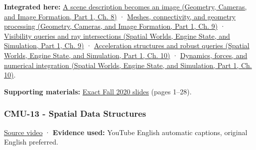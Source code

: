 \textbf{Integrated here:} \href{../03-Geometry-Cameras-and-Image-Formation-P01/main.pdf\#nameddest=03-visual-computing-i-ch001-a-scene-description-becomes-an-image}{A scene description becomes an image (Geometry, Cameras, and Image Formation, Part 1, Ch. 8)} · \href{../03-Geometry-Cameras-and-Image-Formation-P01/main.pdf\#nameddest=03-visual-computing-i-ch002-meshes-connectivity-and-geometry-processing}{Meshes, connectivity, and geometry processing (Geometry, Cameras, and Image Formation, Part 1, Ch. 9)} · \href{../05-Spatial-Worlds-Engine-State-and-Simulation-P01/main.pdf\#nameddest=04-visual-computing-ii-ch028-visibility-queries-and-ray-intersections-1}{Visibility queries and ray intersections (Spatial Worlds, Engine State, and Simulation, Part 1, Ch. 9)} · \href{../05-Spatial-Worlds-Engine-State-and-Simulation-P01/main.pdf\#nameddest=04-visual-computing-ii-ch029-acceleration-structures-and-robust-queries-1}{Acceleration structures and robust queries (Spatial Worlds, Engine State, and Simulation, Part 1, Ch. 10)} · \href{../05-Spatial-Worlds-Engine-State-and-Simulation-P01/main.pdf\#nameddest=04-visual-computing-ii-ch029-dynamics-forces-and-numerical-integration}{Dynamics, forces, and numerical integration (Spatial Worlds, Engine State, and Simulation, Part 1, Ch. 10)}.

\textbf{Supporting materials:} \href{https://15462.courses.cs.cmu.edu/fall2020content/lectures/12_geometricqueries/12_geometricqueries_slides.pdf}{Exact Fall 2020 slides} (pages 1--28).

\subsubsection{CMU-13 - Spatial Data Structures}\label{04-visual-computing-ii-ch036-cmu-13---spatial-data-structures}

\hypertarget{04-visual-computing-ii-ch036-cmu-13---spatial-data-structures}{}

\href{https://www.youtube.com/watch?v=NF7r-pC8fFc}{Source video} · \textbf{Evidence used:} YouTube English automatic captions, original English preferred.

